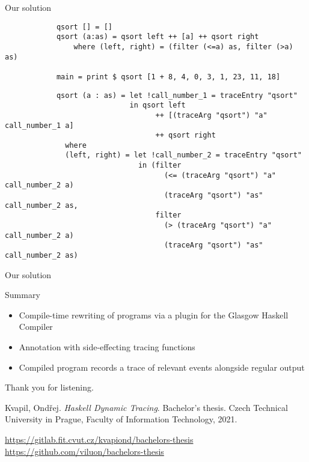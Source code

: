 \documentclass[aspectratio=169]{beamer}
\begin{document}
\begin{frame}[fragile]{Our solution}
	\begin{overprint}
		\begin{verbatim}
			qsort [] = []
			qsort (a:as) = qsort left ++ [a] ++ qsort right
				where (left, right) = (filter (<=a) as, filter (>a) as)

			main = print $ qsort [1 + 8, 4, 0, 3, 1, 23, 11, 18]
		\end{verbatim}

		\begin{verbatim}
			qsort (a : as) = let !call_number_1 = traceEntry "qsort"
			                 in qsort left
			                       ++ [(traceArg "qsort") "a" call_number_1 a]
			                       ++ qsort right
			  where
			  (left, right) = let !call_number_2 = traceEntry "qsort"
			                   in (filter
			                         (<= (traceArg "qsort") "a" call_number_2 a)
			                         (traceArg "qsort") "as" call_number_2 as,
			                       filter
			                         (> (traceArg "qsort") "a" call_number_2 a)
			                         (traceArg "qsort") "as" call_number_2 as)
		\end{verbatim}

	\end{overprint}
\end{frame}

\begin{frame}{Our solution}
\end{frame}

\begin{frame}{Summary}
	\begin{itemize}
		\item Compile-time \alert{rewriting of programs} via a plugin for
			the Glasgow Haskell Compiler \pause
		\item Annotation with side-effecting tracing functions \pause
		\item Compiled program records a trace of relevant events alongside
			regular output
	\end{itemize}
\end{frame}

\begin{frame}{}
	Thank you for listening.

	
	\begin{thebibliography}{1}
		Kvapil, Ondřej.
		\textit{Haskell Dynamic Tracing}.
		Bachelor's thesis.
		Czech Technical University in Prague,
		Faculty of Information Technology, 2021.
	\end{thebibliography}

	\url{https://gitlab.fit.cvut.cz/kvapiond/bachelors-thesis}
	\url{https://github.com/viluon/bachelors-thesis}
\end{frame}
\end{document}
